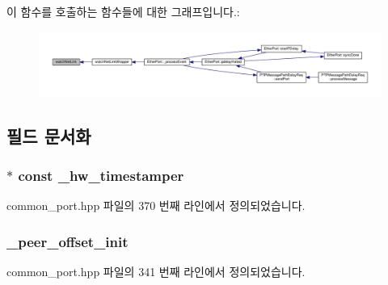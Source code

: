 이 함수를 호출하는 함수들에 대한 그래프입니다.\+:
\nopagebreak
\begin{figure}[H]
\begin{center}
\leavevmode
\includegraphics[width=350pt]{class_common_port_a7fc2ad2925376becd473fcfc684472fb_icgraph}
\end{center}
\end{figure}




\subsection{필드 문서화}
\subsubsection[{\texorpdfstring{\+\_\+hw\+\_\+timestamper}{_hw_timestamper}}]{$\ast$ const \+\_\+hw\+\_\+timestamper\hspace{0.3cm}{\ttfamily [protected]}}\hypertarget{class_common_port_a6b964d49ce26b21cc984b14102973f87}{}\label{class_common_port_a6b964d49ce26b21cc984b14102973f87}


common\+\_\+port.\+hpp 파일의 370 번째 라인에서 정의되었습니다.

\subsubsection[{\texorpdfstring{\+\_\+peer\+\_\+offset\+\_\+init}{_peer_offset_init}}]{ \+\_\+peer\+\_\+offset\+\_\+init\hspace{0.3cm}{\ttfamily [private]}}\hypertarget{class_common_port_af8c00562f3646d6e72ae511b7ccf3df2}{}\label{class_common_port_af8c00562f3646d6e72ae511b7ccf3df2}


common\+\_\+port.\+hpp 파일의 341 번째 라인에서 정의되었습니다.

